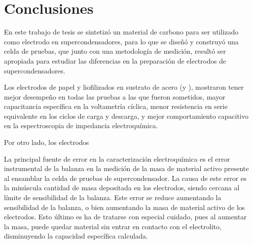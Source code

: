 \chapter{Conclusiones}
En este trabajo de tesis se sintetizó un material de carbono para ser utilizado como electrodo en supercondensadores, para lo que se diseñó y construyó una celda de pruebas, que junto con una metodología de medición, resultó ser apropiada para estudiar las diferencias en la preparación de electrodos de supercondensadores.

Los electrodos de papel y liofilizados en sustrato de acero (\mPapelAcero y \mLiofilizadoAcero), mostraron tener mejor desempeño en todas las pruebas a las que fueron sometidos, mayor capacitancia específica en la voltametría cíclica, menor resistencia en serie equivalente en los ciclos de carga y descarga, y mejor comportamiento capacitivo en la espectroscopia de impedancia electroquímica.

Por otro lado, los electrodos 

La principal fuente de error en la caracterización electroquímica es el error instrumental de la balanza en la medición de la masa de material activo presente al ensamblar la celda de pruebas de supercondensador. La causa de este error es la minúscula cantidad de masa depositada en los electrodos, siendo cercana al límite de sensibilidad de la balanza. Este error se reduce aumentando la sensibilidad de la balanza, o bien aumentando la masa de material activo de los electrodos. Esto último es ha de tratarse con especial cuidado, pues al aumentar la masa, puede quedar material sin entrar en contacto con el electrolito, disminuyendo la capacidad específica calculada. 